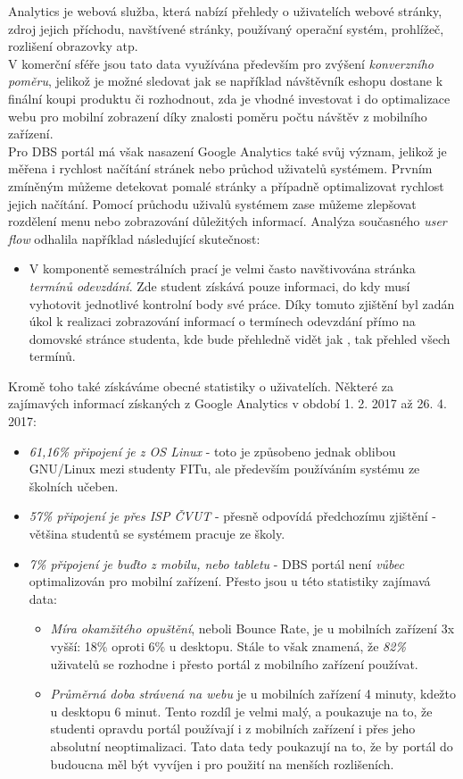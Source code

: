 Analytics \cite{ga} je webová služba, která nabízí přehledy o uživatelích webové stránky, zdroj jejich příchodu, navštívené stránky, používaný operační systém, prohlížeč, rozlišení obrazovky atp.\\
V komerční sféře jsou tato data využívána především pro zvýšení \emph{konverzního poměru}, jelikož je možné sledovat jak se například návštěvník eshopu dostane k finální koupi produktu či rozhodnout, zda je vhodné investovat i do optimalizace webu pro mobilní zobrazení díky znalosti poměru počtu návštěv z mobilního zařízení.\\
Pro DBS portál má však nasazení Google Analytics také svůj význam, jelikož je měřena i rychlost načítání stránek nebo průchod uživatelů systémem. Prvním zmíněným můžeme detekovat pomalé stránky a případně optimalizovat rychlost jejich načítání. Pomocí průchodu uživalů systémem zase můžeme zlepšovat rozdělení menu nebo zobrazování důležitých informací. Analýza současného \emph{user flow} odhalila například následující skutečnost:
\begin{itemize}
	\item V komponentě semestrálních prací je velmi často navštivována stránka \emph{termínů odevzdání}. Zde student získává pouze informaci, do kdy musí vyhotovit jednotlivé kontrolní body své práce. Díky tomuto zjištění byl zadán úkol k realizaci zobrazování informací o termínech odevzdání přímo na domovské stránce studenta, kde bude přehledně vidět jak , tak přehled všech termínů.
\end{itemize}

Kromě toho také získáváme obecné statistiky o uživatelích. Některé za zajímavých informací získaných z Google Analytics v období 1. 2. 2017 až 26. 4. 2017:
\begin{itemize}
	\item \emph{61,16\% připojení je z OS Linux} - toto je způsobeno jednak oblibou GNU/Linux mezi studenty FITu, ale především používáním systému ze školních učeben.
	\item \emph{57\% připojení je přes ISP ČVUT} - přesně odpovídá předchozímu zjištění - většina studentů se systémem pracuje ze školy.
	\item \emph{7\% připojení je buďto z mobilu, nebo tabletu} - DBS portál není \emph{vůbec} optimalizován pro mobilní zařízení. Přesto jsou u této statistiky zajímavá data:
	\begin{itemize}
		\item \emph{Míra okamžitého opuštění}, neboli Bounce Rate, je u mobilních zařízení 3x vyšší: 18\% oproti 6\% u desktopu. Stále to však znamená, že \emph{82\%} uživatelů se rozhodne i přesto portál z mobilního zařízení používat.
		\item \emph{Průměrná doba strávená na webu} je u mobilních zařízení 4 minuty, kdežto u desktopu 6 minut. Tento rozdíl je velmi malý, a poukazuje na to, že studenti opravdu portál používají i z mobilních zařízení i přes jeho absolutní neoptimalizaci. Tato data tedy poukazují na to, že by portál do budoucna měl být vyvíjen i pro použití na menších rozlišeních.
	\end{itemize}
\end{itemize}

